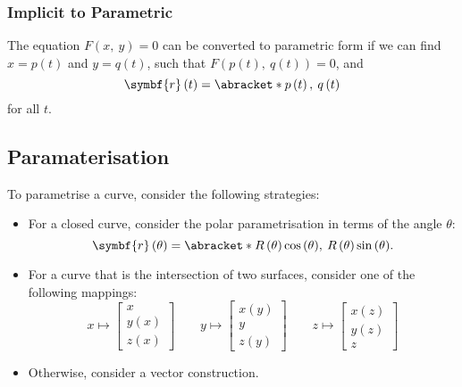 \documentclass{article}
\begin{document}
\subsubsection{Implicit to Parametric}
The equation \(F\left( x,\: y \right) = 0\) can be converted to
parametric form if we can find \(x = p\left( t \right)\) and \(y =
q\left( t \right)\), such that \(F\left( p\left( t \right),\: q\left( t
\right) \right) = 0\), and
\begin{equation*}
    \symbf{r}\left( t \right) = \abracket*{p\left( t \right),\: q\left( t \right)}
\end{equation*}
for all \(t\).
\subsection{Paramaterisation}
To parametrise a curve, consider the following strategies:
\begin{itemize}
    \item For a closed curve, consider the polar parametrisation in
          terms of the angle \(\theta\):
          \begin{equation*}
              \symbf{r}\left( \theta \right) = \abracket*{R\left( \theta \right) \cos{\left( \theta \right)},\: R\left( \theta \right) \sin{\left( \theta \right)}}.
          \end{equation*}
    \item For a curve that is the intersection of two surfaces,
          consider one of the following mappings:
          \begin{equation*}
              x \mapsto
              \begin{bmatrix}
                  x                 \\
                  y\left( x \right) \\
                  z\left( x \right)
              \end{bmatrix}
              \qquad
              y \mapsto
              \begin{bmatrix}
                  x\left( y \right) \\
                  y                 \\
                  z\left( y \right)
              \end{bmatrix}
              \qquad
              z \mapsto
              \begin{bmatrix}
                  x\left( z \right) \\
                  y\left( z \right) \\
                  z
              \end{bmatrix}
          \end{equation*}
    \item Otherwise, consider a vector construction.
\end{itemize}
\end{document}

